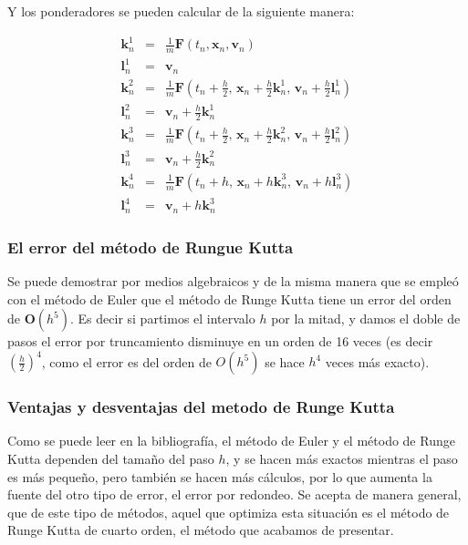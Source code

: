 Y los ponderadores se pueden calcular de la siguiente manera:

\begin{eqnarray}
\textbf{k}_{n}^{1} & = & \frac{1}{m}\textbf{F}(t_n, \textbf{x}_n, \textbf{v}_n) \nonumber \\
\textbf{l}_{n}^{1} & = & \textbf{v}_n \nonumber \\
\textbf{k}_{n}^{2} & = & \frac{1}{m}\textbf{F}(t_n + \frac{h}{2}, \, \textbf{x}_n + \frac{h}{2}\textbf{k}_{n}^{1}, \, \textbf{v}_n + \frac{h}{2}\textbf{l}_{n}^{1}) \nonumber \\
\textbf{l}_{n}^{2} & = & \textbf{v}_n + \frac{h}{2}\textbf{k}_{n}^{1} \nonumber \\
\textbf{k}_{n}^{3} & = & \frac{1}{m}\textbf{F}(t_n + \frac{h}{2}, \, \textbf{x}_n + \frac{h}{2}\textbf{k}_{n}^{2}, \, \textbf{v}_n + \frac{h}{2}\textbf{l}_{n}^{2}) \nonumber \\
\textbf{l}_{n}^{3} & = & \textbf{v}_n + \frac{h}{2}\textbf{k}_{n}^{2} \nonumber \\
\textbf{k}_{n}^{4} & = & \frac{1}{m}\textbf{F}(t_n + h, \, \textbf{x}_n +h\textbf{k}_{n}^{3}, \, \textbf{v}_n + h\textbf{l}_{n}^{3}) \nonumber \\
\textbf{l}_{n}^{4} & = & \textbf{v}_n + h\textbf{k}_{n}^{3}
\label{ponderadores:RK4}
\end{eqnarray}

\subsubsection{El error del método de Rungue Kutta}
Se puede demostrar por medios algebraicos y de la misma manera que se empleó con el método de Euler que el método de Runge Kutta tiene un error del orden de $\textbf{O}(h^5)$.
Es decir si partimos el intervalo $h$ por la mitad, y damos el doble de pasos el error por truncamiento disminuye en un orden de 16 veces (es decir $\left( \frac{h}{2} \right)^4$, como el error es del orden de $O(h^5)$ se hace $h^4$ veces más exacto).

\subsubsection{Ventajas y desventajas del metodo de Runge Kutta}
Como se puede leer en la bibliografía, el método de Euler y el método de Runge Kutta dependen del tamaño del paso $h$, y se hacen más exactos mientras el paso es más pequeño, pero también se hacen más cálculos, por lo que aumenta la fuente del otro tipo de error, el error por redondeo.
Se acepta de manera general, que de este tipo de métodos, aquel que optimiza esta situación es el método de Runge Kutta de cuarto orden, el método que acabamos de presentar.

